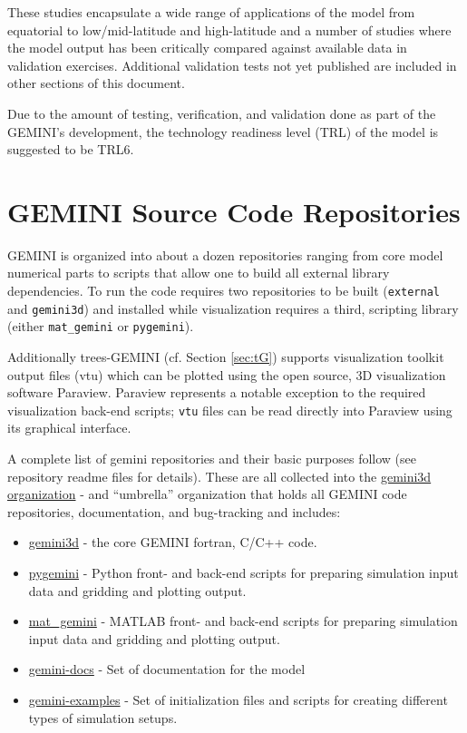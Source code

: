 \documentclass[11pt,letterpaper]{article}
\begin{document}
These studies encapsulate a wide range of applications of the model from equatorial to low/mid-latitude and high-latitude and a number of studies where the model output has been critically compared against available data in validation exercises.  Additional validation tests not yet published are included in other sections of this document.  

Due to the amount of testing, verification, and validation done as part of the GEMINI's development, the technology readiness level (TRL) of the model is suggested to be TRL6.  



\section{GEMINI Source Code Repositories}

GEMINI is organized into about a dozen repositories ranging from core model numerical parts to scripts that allow one to build all external library dependencies.  To run the code requires two repositories to be built (\texttt{external} and \texttt{gemini3d}) and installed while visualization requires a third, scripting library (either \texttt{mat\_gemini} or \texttt{pygemini}).  

Additionally trees-GEMINI (cf. Section \ref{sec:tG}) supports visualization toolkit output files (vtu) which can be plotted using the open source, 3D visualization software Paraview.  Paraview represents a notable exception to the required visualization back-end scripts; \texttt{vtu} files can be read directly into Paraview using its graphical interface.  

A complete list of gemini repositories and their basic purposes follow (see repository readme files for details).  These are all collected into the \href{https://github.com/gemini3d/}{gemini3d organization} - and ``umbrella'' organization that holds all GEMINI code repositories, documentation, and bug-tracking and includes:  
\begin{itemize}
  \item \href{https://github.com/gemini3d/gemini3d/}{gemini3d} - the core GEMINI fortran, C/C++ code.  
  \item \href{https://github.com/gemini3d/pygemini}{pygemini} - Python front- and back-end scripts for preparing simulation input data and gridding and plotting output.  
  \item \href{https://github.com/gemini3d/pygemini}{mat\_gemini} - MATLAB front- and back-end scripts for preparing simulation input data and gridding and plotting output.  
  \item  \href{https://github.com/gemini3d/gemini-docs}{gemini-docs} - Set of documentation for the model
  \item  \href{https://github.com/gemini3d/gemini-examples}{gemini-examples} - Set of initialization files and scripts for creating different types of simulation setups.    
\end{itemize}
\end{document}
